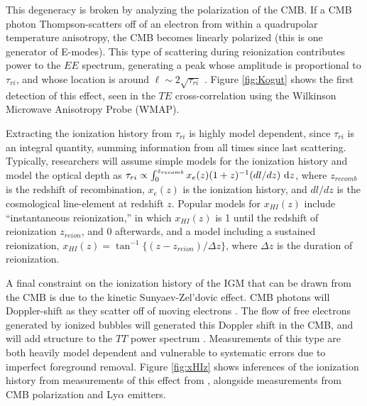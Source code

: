 This degeneracy is broken by analyzing the polarization of the CMB. If a CMB photon Thompson-scatters 
off of an electron from within a quadrupolar temperature anisotropy, the CMB becomes
linearly polarized (this is one generator of E-modes). This type of scattering during reionization
contributes power to the $EE$ spectrum, generating a peak whose amplitude is proportional to
$\tau_{ri}$, and whose location is around $\ell \sim 2\sqrt{\tau_{ri}}$
\cite{Zaldarriaga1997-reionization}. Figure \ref{fig:Kogut} shows the first detection of this
effect, seen in the $TE$ cross-correlation using the Wilkinson Microwave Anisotropy Probe
(WMAP).

Extracting the ionization history from $\tau_{ri}$ is highly model dependent, since $\tau_{ri}$ is
an integral quantity, summing information from all times since last scattering. Typically,
researchers will assume simple models for the ionization history and model the optical depth as 
$\tau_{ri} \propto \int_0^{z_{recomb}}x_{e}(z)(1+z)^{-1}(dl/dz)\ \mathrm{d}z$, where $z_{recomb}$ is the
redshift of recombination, $x_{e}(z)$ is the ionization history, and $dl/dz$ is the cosmological 
line-element at redshift $z$. Popular models for $x_{HI}(z)$ include ``instantaneous reionization,'' 
in which $x_{HI}(z)$ is 1 until the redshift of reionization $z_{reion}$, and 0 afterwards, and a
model including a sustained reionization, $x_{HI}(z) = \tan^{-1}\{(z-z_{reion})/\Delta z\}$, where
$\Delta z$ is the duration of reionization.

A final constraint on the ionization history of the IGM that can be drawn from the CMB is due to the
kinetic Sunyaev-Zel'dovic effect. CMB photons will Doppler-shift as they scatter off of moving
electrons \cite{Sunyaev1980}. The flow of free electrons generated by ionized bubbles will generated 
this Doppler shift in the CMB, and will add structure to the $TT$ power spectrum \cite{Zahn2012}.
Measurements of this type are both heavily model dependent and vulnerable to systematic errors due
to imperfect foreground removal. Figure \ref{fig:xHIz} shows inferences of the ionization history 
from measurements of this effect from \citet{Zahn2012}, alongside measurements from CMB polarization 
and Ly$\alpha$ emitters. 

